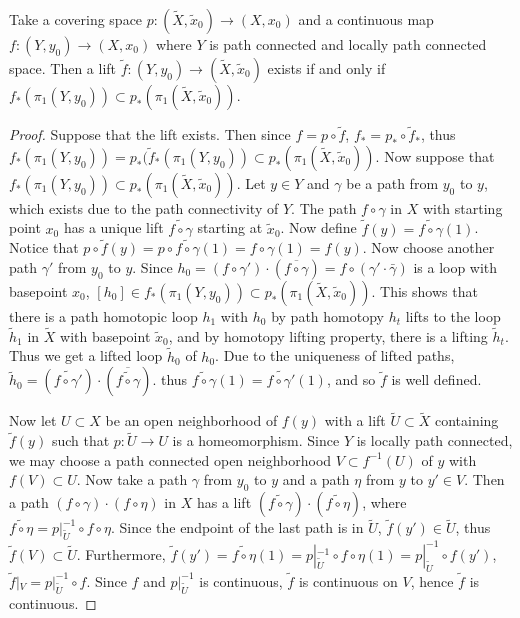 \begin{prop} Take a covering space $p:(\tilde{X},\tilde{x}_0)\rightarrow (X,x_0)$ and a continuous map $f:(Y,y_0)\rightarrow (X,x_0)$ where $Y$ is path connected and locally path connected space. Then a lift $\tilde{f}:(Y,y_0)\rightarrow (\tilde{X},\tilde{x}_0)$ exists if and only if $f_*(\pi_1(Y,y_0))\subset p_*(\pi_1(\tilde{X},\tilde{x}_0))$.
\end{prop}
\begin{proof}
Suppose that the lift exists. Then since $f=p\circ \tilde{f}$, $f_*=p_*\circ \tilde{f}_*$, thus $f_*(\pi_1(Y,y_0))=p_*(\tilde{f}_*(\pi_1(Y,y_0))\subset p_*(\pi_1(\tilde{X},\tilde{x}_0))$. Now suppose that $f_*(\pi_1(Y,y_0))\subset p_*(\pi_1(\tilde{X},\tilde{x}_0))$. Let $y\in Y$ and $\gamma$ be a path from $y_0$ to $y$, which exists due to the path connectivity of $Y$. The path $f\circ \gamma$ in $X$ with starting point $x_0$ has a unique lift $\widetilde{f\circ \gamma}$ starting at $\tilde{x}_0$. Now define $\tilde{f}(y)=\widetilde{f\circ \gamma}(1)$. Notice that $p\circ \tilde{f}(y)=p\circ \widetilde{f\circ \gamma}(1)=f\circ \gamma(1)=f(y)$. Now choose another path $\gamma'$ from $y_0$ to $y$. Since $h_0=(f\circ \gamma')\cdot (\overline{f\circ \gamma})=f\circ(\gamma'\cdot \bar{\gamma})$ is a loop with basepoint $x_0$, $[h_0]\in f_*(\pi_1(Y,y_0))\subset p_*(\pi_1(\tilde{X},\tilde{x}_0))$. This shows that there is a path homotopic loop $h_1$ with $h_0$ by path homotopy $h_t$ lifts to the loop $\tilde{h}_1$ in $\tilde{X}$ with basepoint $\tilde{x}_0$, and by homotopy lifting property, there is a lifting $\tilde{h}_t$. Thus we get a lifted loop $\tilde{h}_0$ of $h_0$. Due to the uniqueness of lifted paths, $\tilde{h}_0=(\widetilde{f\circ \gamma'})\cdot(\overline{\widetilde{f\circ \gamma}})$. thus $\tilde{f\circ \gamma}(1)=\tilde{f\circ \gamma'}(1)$, and so $\tilde{f}$ is well defined.

Now let $U\subset X$ be an open neighborhood of $f(y)$ with a lift $\tilde{U}\subset \tilde{X}$ containing $\tilde{f}(y)$ such that $p:\tilde{U}\rightarrow U$ is a homeomorphism. Since $Y$ is locally path connected, we may choose a path connected open neighborhood $V\subset f^{-1}(U)$ of $y$ with $f(V)\subset U$. Now take a path $\gamma$ from $y_0$ to $y$ and a path $\eta$ from $y$ to $y'\in V$. Then a path $(f\circ \gamma)\cdot (f\circ \eta)$ in $X$ has a lift $(\widetilde{f\circ \gamma})\cdot (\widetilde{f\circ \eta})$, where $\widetilde{f\circ \eta}=p|_{\tilde{U}}^{-1}\circ f\circ \eta$. Since the endpoint of the last path is in $\tilde{U}$, $\tilde{f}(y')\in \tilde{U}$, thus $\tilde{f}(V)\subset \tilde{U}$. Furthermore, $\tilde{f}(y')=\widetilde{f\circ \eta}(1)=p|_{\tilde{U}}^{-1}\circ f\circ \eta(1)=p|_{\tilde{U}}^{-1}\circ f(y')$, $\tilde{f}|_V=p|_{\tilde{U}}^{-1}\circ f$. Since $f$ and $p|_{\tilde{U}}^{-1}$ is continuous, $\tilde{f}$ is continuous on $V$, hence $\tilde{f}$ is continuous.
\end{proof}

